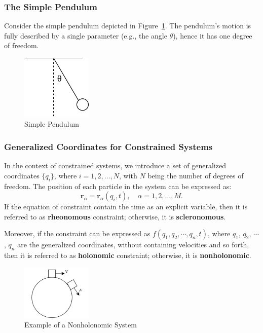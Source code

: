 \subsubsection*{The Simple Pendulum}

Consider the simple pendulum depicted in Figure~\ref{fig:1-1-2}. The pendulum's motion is fully described by a single parameter (e.g., the angle $\theta$), hence it has one degree of freedom.

\begin{figure}[ht]
    \centering
    \includegraphics[width=0.3\textwidth]{images/1-1-2.png}
    \caption{Simple Pendulum}
    \label{fig:1-1-2}
\end{figure}

\subsubsection*{Generalized Coordinates for Constrained Systems}

In the context of constrained systems, we introduce a set of generalized coordinates $\{q_i\}$, where $i = 1, 2, \dots, N$, with $N$ being the number of degrees of freedom. The position of each particle in the system can be expressed as:
\begin{equation}
    \mathbf{r}_\alpha = \mathbf{r}_\alpha(q_i, t), \quad \alpha = 1, 2, \dots, M.
\end{equation}
If the equation of constraint contain the time as an explicit variable, then it is referred to as \textbf{rheonomous} constraint; otherwise, it is \textbf{scleronomous}. 

Moreover, if the constraint can be expressed as $f\left(q_1, q_2, \cdots, q_n, t\right)$, where $q_1$, $q_2$, $\cdots$, $q_n$ are the generalized coordinates, without containing velocities and so forth, then it is referred to as \textbf{holonomic} constraint; otherwise, it is \textbf{nonholonomic}.

\begin{figure}[ht]
    \centering
    \includegraphics[width=0.3\textwidth]{images/1-1-3.png}
    \caption{Example of a Nonholonomic System}
    \label{fig:1-1-3}
\end{figure}

